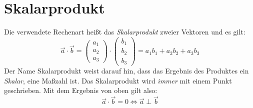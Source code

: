\documentclass[12pt,a4paper,twoside,fleqn]{article}
\begin{document}
\section{Skalarprodukt}
Die verwendete Rechenart heißt das {\em Skalarprodukt} zweier
Vektoren und es gilt:
$$ \vec{a} \cdot \vec{b} =
\begin{pmatrix}
        a_1\\a_2\\a_3
      \end{pmatrix} \cdot
      \begin{pmatrix}
        b_1\\b_2\\b_3
      \end{pmatrix} = 
      a_1b_1 + a_2b_2+a_3b_3$$
Der Name Skalarprodukt weist darauf hin, dass das Ergebnis des
Produktes ein {\em Skalar}, eine Maßzahl ist. Das Skalarprodukt wird
{\em immer} mit einem Punkt geschrieben.
Mit dem Ergebnis von oben gilt also:
$$\vec{a}\cdot\vec{b} = 0 \Leftrightarrow \vec{a}\perp\vec{b}$$
\end{document}
